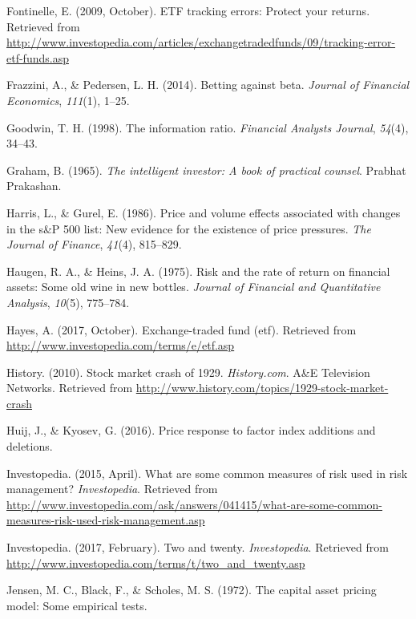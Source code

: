 \documentclass[12pt,twoside]{reedthesis}
\theoremstyle{definition}
\theoremstyle{definition}
\theoremstyle{definition}
\theoremstyle{remark}
\begin{document}
\hypertarget{ref-fontinelle2009}{}
Fontinelle, E. (2009, October). ETF tracking errors: Protect your
returns. Retrieved from
\url{http://www.investopedia.com/articles/exchangetradedfunds/09/tracking-error-etf-funds.asp}

\hypertarget{ref-frazzini2014}{}
Frazzini, A., \& Pedersen, L. H. (2014). Betting against beta.
\emph{Journal of Financial Economics}, \emph{111}(1), 1--25.

\hypertarget{ref-goodwin1998}{}
Goodwin, T. H. (1998). The information ratio. \emph{Financial Analysts
Journal}, \emph{54}(4), 34--43.

\hypertarget{ref-graham1965}{}
Graham, B. (1965). \emph{The intelligent investor: A book of practical
counsel}. Prabhat Prakashan.

\hypertarget{ref-harris1986}{}
Harris, L., \& Gurel, E. (1986). Price and volume effects associated
with changes in the s\&P 500 list: New evidence for the existence of
price pressures. \emph{The Journal of Finance}, \emph{41}(4), 815--829.

\hypertarget{ref-haugen1975}{}
Haugen, R. A., \& Heins, J. A. (1975). Risk and the rate of return on
financial assets: Some old wine in new bottles. \emph{Journal of
Financial and Quantitative Analysis}, \emph{10}(5), 775--784.

\hypertarget{ref-hayes2017}{}
Hayes, A. (2017, October). Exchange-traded fund (etf). Retrieved from
\url{http://www.investopedia.com/terms/e/etf.asp}

\hypertarget{ref-history2010}{}
History. (2010). Stock market crash of 1929. \emph{History.com}. A\&E
Television Networks. Retrieved from
\url{http://www.history.com/topics/1929-stock-market-crash}

\hypertarget{ref-huij2016}{}
Huij, J., \& Kyosev, G. (2016). Price response to factor index additions
and deletions.

\hypertarget{ref-investopedia2015}{}
Investopedia. (2015, April). What are some common measures of risk used
in risk management? \emph{Investopedia}. Retrieved from
\url{http://www.investopedia.com/ask/answers/041415/what-are-some-common-measures-risk-used-risk-management.asp}

\hypertarget{ref-investopedia2017}{}
Investopedia. (2017, February). Two and twenty. \emph{Investopedia}.
Retrieved from
\url{http://www.investopedia.com/terms/t/two_and_twenty.asp}

\hypertarget{ref-jensen1972}{}
Jensen, M. C., Black, F., \& Scholes, M. S. (1972). The capital asset
pricing model: Some empirical tests.
\end{document}
